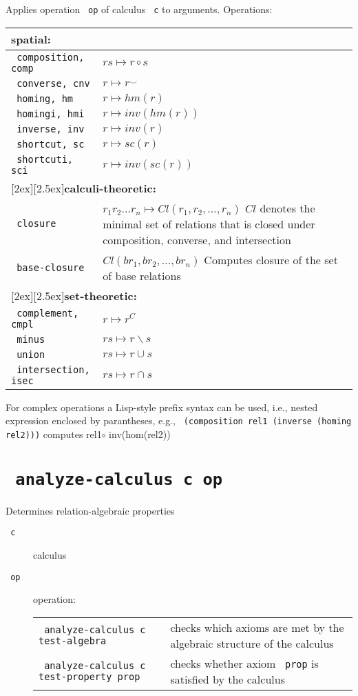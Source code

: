 \documentclass[headsepline]{scrreprt}
\theoremstyle{definition}
\newcommand{\binaryonly}{\raisebox{1ex}{\scriptsize(2)}}
\newcommand{\ternaryonly}{\raisebox{1ex}{\scriptsize(3)}}
\begin{document}
Applies operation \texttt{ op} of calculus \texttt{ c} to arguments. Operations:
\begin{longtable}{|l|p{10cm}|}
\hline
\multicolumn{2}{|l|}{\bfseries spatial:}\\ \hline
\texttt{ composition, comp} & $ r s \mapsto r \circ s$\\
\texttt{ converse, cnv}\binaryonly & $r \mapsto r^{\smile}$ \\
\texttt{ homing, hm}\ternaryonly & $ r \mapsto hm(r)$\\
\texttt{ homingi, hmi}\ternaryonly & $ r \mapsto inv(hm(r))$\\
\texttt{ inverse, inv}\ternaryonly & $ r \mapsto inv(r)$\\
\texttt{ shortcut, sc}\ternaryonly & $ r \mapsto sc(r)$\\
\texttt{ shortcuti, sci}\ternaryonly & $ r \mapsto inv(sc(r))$\\[1ex]
\hline
\multicolumn{2}{|l|}{\raisebox{-2ex}[2ex][2.5ex]{{\bfseries calculi-theoretic:}}}\\ \hline
\texttt{ closure} & $ r_1 r_2 \ldots r_n \mapsto Cl(r_1,r_2,\ldots, r_n)$\newline
$Cl$ denotes the minimal set of relations that is closed under composition, converse,
and intersection\\
\texttt{ base-closure} & $Cl(br_1,br_2,\ldots , br_n)$\newline
Computes closure of the set of base relations\\
\hline
\multicolumn{2}{|l|}{\raisebox{-2ex}[2ex][2.5ex]{{\bfseries set-theoretic:}}}\\ \hline
\texttt{ complement, cmpl} & $ r \mapsto r^C$\\
\texttt{ minus} & $ r s \mapsto r \backslash s$\\
\texttt{ union} & $ r s \mapsto r \cup s$\\
\texttt{ intersection, isec} & $ r s \mapsto r \cap s$\\
\hline
\end{longtable}
For complex operations a Lisp-style prefix syntax can be used, i.e., nested expression enclosed by parantheses, e.g., \texttt{ (composition rel1 (inverse (homing rel2)))} computes rel1$\circ$ inv(hom(rel2))

\section*{\texttt{ analyze-calculus c op}}
Determines relation-algebraic properties
\begin{description}
	\item[\texttt{ c}] calculus
	\item[\texttt{ op}] operation:
	\begin{longtable}{|lp{6cm}|}
	\hline
\texttt{ analyze-calculus c test-algebra} &  checks which axioms are met by the algebraic structure of the calculus\\
\texttt{ analyze-calculus c test-property prop} &  checks whether axiom \texttt{ prop} is satisfied by the calculus\\
\hline
\end{longtable}
\end{description}
\end{document}
